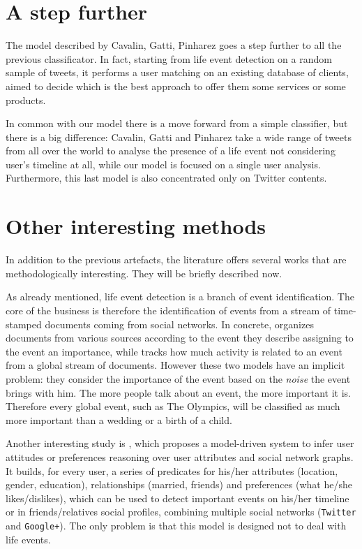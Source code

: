 \section{A step further}
\label{sec:further}
The model described by Cavalin, Gatti, Pinharez \cite{cavalin2014towards} goes a step further to all the previous classificator. In fact, starting from life event detection on a random sample of tweets, it performs a user matching on an existing database of clients, aimed to decide which is the best approach to offer them some services or some products.

In common with our model there is a move forward from a simple classifier, but there is a big difference: Cavalin, Gatti and Pinharez take a wide range of tweets from all over the world to analyse the presence of a life event not considering user's timeline at all, while our model is focused on a single user analysis. Furthermore, this last model is also concentrated only on Twitter contents.

\section{Other interesting methods}
\label{sec:other}
In addition to the previous artefacts, the literature offers several works that are methodologically interesting. They will be briefly described now.

As already mentioned, life event detection is a branch of event identification. The core of the business is therefore the identification of events from a stream of time-stamped documents coming from social networks. In concrete, \cite{vavliakis2013event} organizes documents from various sources according to the event they describe assigning to the event an importance, while \cite{chen2009adaptive} tracks how much activity is related to an event from a global stream of documents. However these two models have an implicit problem: they consider the importance of the event based on the \textit{noise} the event brings with him. The more people talk about an event, the more important it is. Therefore every global event, such as The Olympics, will be classified as much more important than a wedding or a birth of a child.

Another interesting study is \cite{li2014inferring}, which proposes a model-driven system to infer user attitudes or preferences reasoning over user attributes and social network graphs. It builds, for every user, a series of predicates for his/her attributes (location, gender, education), relationships (married, friends) and preferences (what he/she likes/dislikes), which can be used to detect important events on his/her timeline or in friends/relatives social profiles, combining multiple social networks (\texttt{Twitter} and \texttt{Google+}). The only problem is that this model is designed not to deal with life events.

